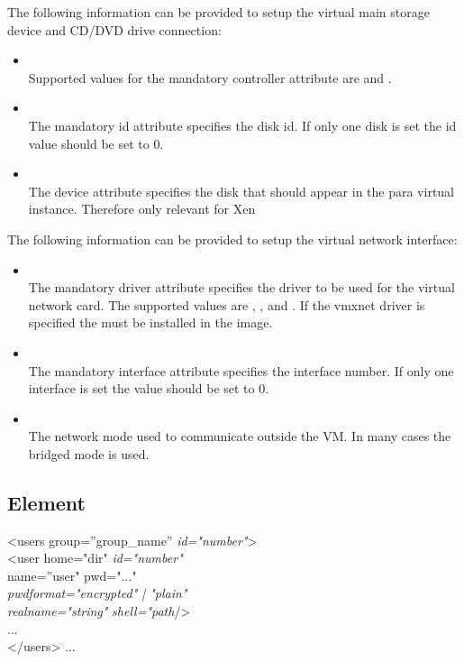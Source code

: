 \begin{itemize}
	The following information can be provided to setup the virtual
	main storage device and CD/DVD drive connection:

	\begin{itemize}
	\item {}\\
      Supported values for the mandatory controller attribute are 
      and .
	\item {}\\
      The mandatory id attribute specifies the disk id. If only one
      disk is set the id value should be set to 0.
	\item {}\\
      The device attribute specifies the disk that should appear
      in the para virtual instance. Therefore only relevant for Xen
	\end{itemize}

	The following information can be provided to setup the virtual
	network interface:

	\begin{itemize}
	\item {}\\
      The mandatory driver attribute specifies the driver to be used for
      the virtual network card. The supported values are ,
      , and . If the vmxnet driver is
      specified the  must be installed in the image.
	\item {}\\
      The mandatory interface attribute specifies the interface number. If
      only one interface is set the value should be set to 0.
	\item {}\\
      The network mode used to communicate outside the VM. In many cases
      the bridged mode is used.
	\end{itemize}
\end{itemize}

\subsection{ Element}
\begin{Command}{12cm}
<users group=''group\_name'' \textit{id="number"}>\\
\hspace*{1cm}<user home="dir" \textit{id="number"}\\ 
\hspace*{1.5cm}name=''user" pwd="..."\\
\hspace*{1.5cm}\textit{pwdformat="encrypted" | "plain"}\\
\hspace*{1.5cm}\textit{realname="string"} \textit{shell="path}/>\\
\hspace*{1cm}...\\
</users>
...
\end{Command}

